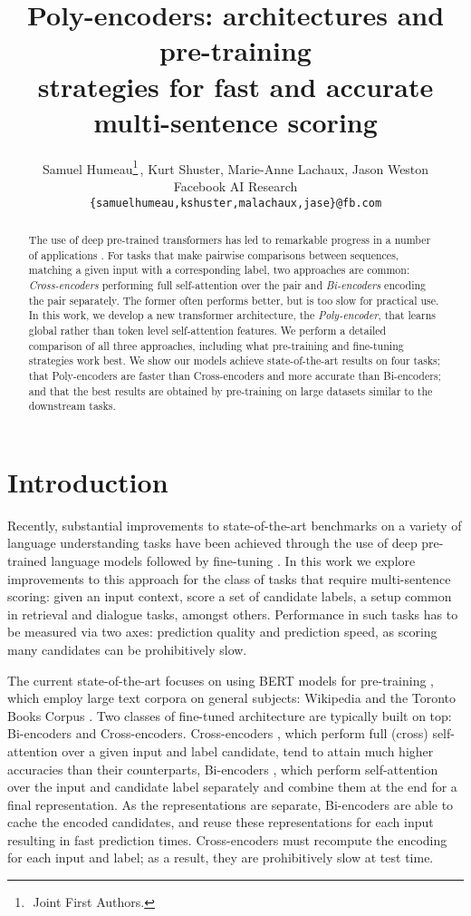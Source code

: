 \documentclass{article} \usepackage{iclr2020_conference,times}
\title{Poly-encoders: architectures and pre-training \\strategies for fast and accurate multi-sentence scoring}
\author{Samuel Humeau\thanks{\,\,Joint First Authors.}\,, Kurt Shuster, Marie-Anne Lachaux, Jason Weston\\
Facebook AI Research \\
{\tt \{samuelhumeau,kshuster,malachaux,jase\}@fb.com}
}
\begin{document}
\maketitle

\begin{abstract}
The use of deep pre-trained 
transformers has led to remarkable progress in 
a number of applications \citep{devlin-etal-2019-bert}. 
For tasks that make pairwise comparisons between sequences,  matching a given input with a corresponding label,
two approaches are common: \textit{Cross-encoders} performing full self-attention over the pair and   \textit{Bi-encoders} encoding the pair separately. The former often performs better, but is too slow for practical use.
In this work, we develop a new transformer architecture, the \textit{Poly-encoder}, that learns global rather than token level self-attention features. 
We perform a detailed comparison of all three approaches, including 
what pre-training and fine-tuning strategies work best. 
We show  our models achieve state-of-the-art results on four tasks;
that Poly-encoders are faster than Cross-encoders and more accurate than Bi-encoders;
and that the best results are obtained by pre-training on large datasets
similar to the downstream tasks. 

\end{abstract}

\section{Introduction}

Recently, substantial improvements to state-of-the-art benchmarks on a variety of language understanding tasks have been achieved through the use of deep pre-trained language models followed by fine-tuning \citep{devlin-etal-2019-bert}. 
In this work we explore improvements to this approach for the class of tasks 
that require multi-sentence scoring: given an input context, score a set of candidate labels, a setup common in retrieval and dialogue tasks, amongst others. Performance in such tasks has to be measured via two axes: 
prediction quality and prediction speed, as scoring many candidates can be prohibitively slow.


The current state-of-the-art focuses on using BERT models for pre-training \citep{devlin-etal-2019-bert}, which employ large text corpora on general subjects: Wikipedia and the Toronto Books Corpus \citep{Zhu2015AligningBA}. 
Two classes of fine-tuned architecture are typically built on top: 
Bi-encoders and Cross-encoders.
Cross-encoders \citep{wolf2019transfertransfo,vig2019comparison}, which perform full (cross) self-attention over a given input and label candidate, tend to attain much higher accuracies than their counterparts, Bi-encoders \citep{training_millions,dinan2019wizard}, which perform self-attention over the input and candidate label separately and combine them at the end for a final representation. As the representations are separate, Bi-encoders 
are able to cache the encoded candidates, and reuse these representations for each input resulting in fast prediction times.
Cross-encoders must recompute the encoding for each input and label; as a result, they are prohibitively slow at test time.
\end{document}
